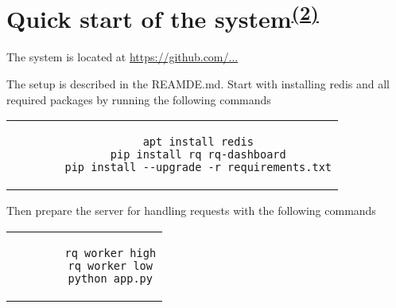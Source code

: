 \appendix
\chapter{Quick start of the system\textsuperscript{\hyperref[Oliver]{(2)}}}

The system is located at
\url{https://github.com/...}

The setup is described in the REAMDE.md.
Start with installing redis and all required packages by running the following commands

\begin{center}
	\begin{tabular}{c}
		\begin{lstlisting}
		apt install redis
		pip install rq rq-dashboard
		pip install --upgrade -r requirements.txt
		\end{lstlisting}
	\end{tabular}
\end{center}

Then prepare the server for handling requests with the following commands

\begin{center}
	\begin{tabular}{c}
		\begin{lstlisting}
		rq worker high
		rq worker low
		python app.py
		\end{lstlisting}
	\end{tabular}
\end{center}